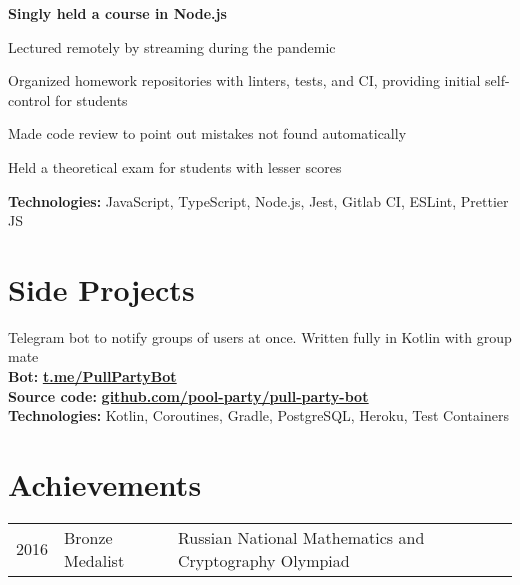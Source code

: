 \documentclass[]{resume}
\begin{document}
\begin{minipage}[t]{0.66\textwidth}
{\bf Singly held a course in Node.js}
\begin{tightemize}
\item Lectured remotely by streaming during the pandemic
\item Organized homework repositories with linters, tests, and CI, providing initial self-control for students
\item Made code review to point out mistakes not found automatically
\item Held a theoretical exam for students with lesser scores
\end{tightemize}
{\bf Technologies:} JavaScript, TypeScript, Node.js, Jest, Gitlab CI, ESLint, Prettier JS
\sectionsep


\section{Side Projects}
\descript{}
Telegram bot to notify groups of users at once. Written fully in Kotlin with group mate \\

{\bf Bot:} \href{https://t.me/PullPartyBot}{\underline {\bf t.me/PullPartyBot}} \\
{\bf Source code:} \href{https://github.com/pool-party/pull-party-bot}{\underline {\bf github.com/pool-party/pull-party-bot}} \\
{\bf Technologies:} Kotlin, Coroutines, Gradle, PostgreSQL, Heroku, Test Containers

\sectionsep


\section{Achievements} 
\begin{tabular}{rll}
2016	     & Bronze Medalist  & Russian National Mathematics and Cryptography Olympiad
\end{tabular}
\sectionsep

\end{minipage} 
\end{document}
